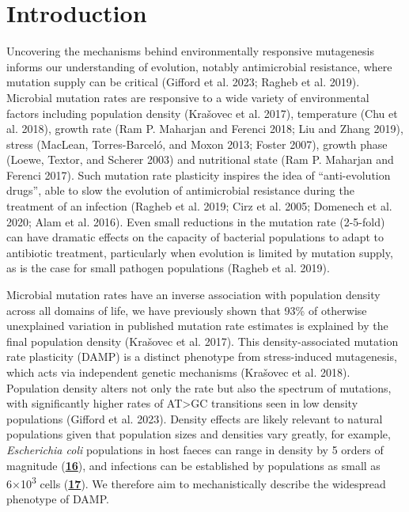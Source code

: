 \documentclass[
  12pt,
  letterpaper,
  DIV=11,
  numbers=noendperiod]{scrreprt}
\begin{document}
\hypertarget{introduction}{%
\chapter{Introduction}\label{introduction}}

Uncovering the mechanisms behind environmentally responsive mutagenesis
informs our understanding of evolution, notably antimicrobial
resistance, where mutation supply can be critical (Gifford et al. 2023;
Ragheb et al. 2019). Microbial mutation rates are responsive to a wide
variety of environmental factors including population density (Krašovec
et al. 2017), temperature (Chu et al. 2018), growth rate (Ram P.
Maharjan and Ferenci 2018; Liu and Zhang 2019), stress (MacLean,
Torres-Barceló, and Moxon 2013; Foster 2007), growth phase (Loewe,
Textor, and Scherer 2003) and nutritional state (Ram P. Maharjan and
Ferenci 2017). Such mutation rate plasticity inspires the idea of
``anti-evolution drugs'', able to slow the evolution of antimicrobial
resistance during the treatment of an infection (Ragheb et al. 2019;
Cirz et al. 2005; Domenech et al. 2020; Alam et al. 2016). Even small
reductions in the mutation rate (2-5-fold) can have dramatic effects on
the capacity of bacterial populations to adapt to antibiotic treatment,
particularly when evolution is limited by mutation supply, as is the
case for small pathogen populations (Ragheb et al. 2019).

Microbial mutation rates have an inverse association with population
density across all domains of life, we have previously shown that 93\%
of otherwise unexplained variation in published mutation rate estimates
is explained by the final population density (Krašovec et al. 2017).
This density-associated mutation rate plasticity (DAMP) is a distinct
phenotype from stress-induced mutagenesis, which acts via independent
genetic mechanisms (Krašovec et al. 2018). Population density alters not
only the rate but also the spectrum of mutations, with significantly
higher rates of AT\textgreater GC transitions seen in low density
populations (Gifford et al. 2023). Density effects are likely relevant
to natural populations given that population sizes and densities vary
greatly, for example, \emph{Escherichia coli} populations in host faeces
can range in density by 5 orders of magnitude
(\href{https://www.biorxiv.org/content/10.1101/2023.09.27.557722v1.full\#ref-16}{\textbf{16}}),
and infections can be established by populations as small as
6×10\textsuperscript{3} cells
(\href{https://www.biorxiv.org/content/10.1101/2023.09.27.557722v1.full\#ref-17}{\textbf{17}}).
We therefore aim to mechanistically describe the widespread phenotype of
DAMP.
\end{document}
